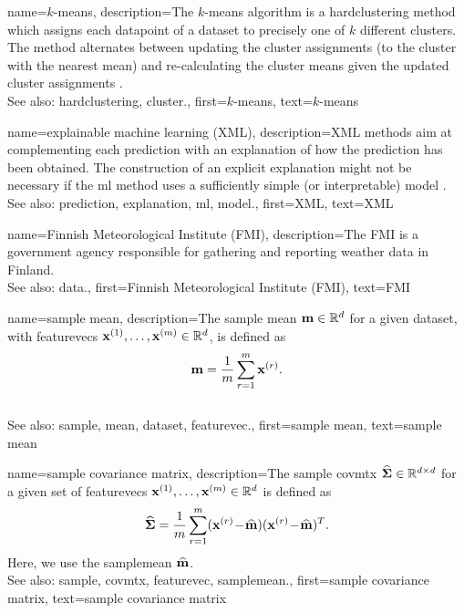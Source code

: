 	
{name={$k$-means}, 
	description={The $k$-\glspl{mean} \gls{algorithm} 
		is a \gls{hardclustering} method which assigns each \gls{datapoint} of a \gls{dataset} 
		to precisely one of $k$ different \glspl{cluster}. The method alternates between updating 
		the \gls{cluster} assignments (to the \gls{cluster} with the nearest \gls{mean}) and 
		re-calculating the \gls{cluster} \glspl{mean} given the updated \gls{cluster} assignments \cite[Ch. 8]{MLBasics}.
				\\
		See also: \gls{hardclustering}, \gls{cluster}.},
	first={$k$-means},
	text={$k$-means} 
}


{name={explainable machine learning (XML)}, 
	description={XML 
		methods aim at complementing each \gls{prediction} with an \gls{explanation} of 
		how the \gls{prediction} has been obtained. The construction of an explicit \gls{explanation} 
		might not be necessary if the \gls{ml} method uses a sufficiently simple (or interpretable) \gls{model} \cite{rudin2019stop}.
				\\
		See also: \gls{prediction}, \gls{explanation}, \gls{ml}, \gls{model}.},
	first={XML},
	text={XML} 
}

{name={Finnish Meteorological Institute (FMI)}, 
	description={The
		FMI is a government agency responsible for gathering 
		and reporting weather \gls{data} in Finland.
				\\
		See also: \gls{data}.},
	first={Finnish Meteorological Institute (FMI)},
	text={FMI} 
}
	
	
{name={sample mean}, 
	description={The \gls{sample} \gls{mean} 
		${\bf m} \in \mathbb{R}^{d}$ for a given \gls{dataset}, with \glspl{featurevec} ${\bf x}^{(1)}, \ldots, {\bf x}^{(m)} \in \mathbb{R}^{d}$, 
		is defined as 
		$${\bf m} = \frac{1}{m} \sum_{r=1}^{m} {\bf x}^{(r)}.$$ 
					\\
		See also: \gls{sample}, \gls{mean}, \gls{dataset}, \gls{featurevec}.},
	first={sample mean},
	text={sample mean} 
}

	
{name={sample covariance matrix}, 
	description={The 
		\gls{sample} \gls{covmtx} $\widehat{\bf \Sigma} \in \mathbb{R}^{d \times d}$ 
		for a given set of \glspl{featurevec} ${\bf x}^{(1)}, \ldots, {\bf x}^{(m)} \in \mathbb{R}^{d}$ is defined as 
		$$\widehat{\bf \Sigma} = \frac{1}{m} \sum_{r=1}^{m} ({\bf x}^{(r)}\!-\!\widehat{{\bf m}}) ({\bf x}^{(r)}\!-\!\widehat{{\bf m}})^{T}.$$ 
		Here, we use the \gls{samplemean} $\widehat{{\bf m}}$. 
				\\
		See also: \gls{sample}, \gls{covmtx}, \gls{featurevec}, \gls{samplemean}.},
	first={sample covariance matrix},
	text={sample covariance matrix} 
}

